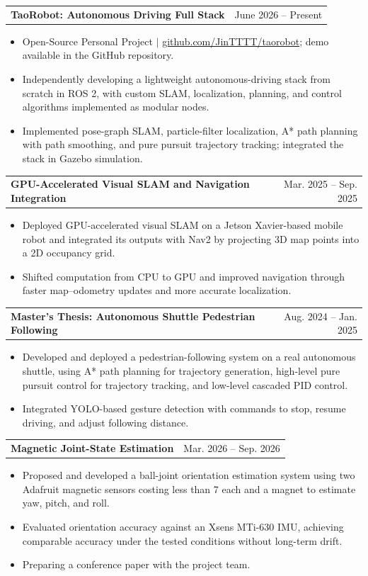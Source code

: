 \documentclass[letterpaper,11pt]{article}
\makeatletter
\newcommand{\resumeItem}[1]{
  \item\small{
    {#1 \vspace{-2pt}}
  }
}
\newcommand{\resumeProjectHeading}[2]{
    \item
    \begin{tabularx}{0.97\textwidth}{@{}>{\raggedright\arraybackslash}X r@{}}
      \small#1 & #2 \\
    \end{tabularx}\vspace{-7pt}
}
\newcommand{\resumeItemListStart}{\begin{itemize}[rightmargin=0.15in]\justifying}
\newcommand{\resumeItemListEnd}{\end{itemize}\vspace{-5pt}}
\makeatother
\begin{document}
      \resumeProjectHeading
          {\textbf{TaoRobot: Autonomous Driving Full Stack}}{June 2026 -- Present}
          \resumeItemListStart
            \resumeItem{Open-Source Personal Project $|$ \href{https://github.com/JinTTTT/taorobot}{github.com/JinTTTT/taorobot}; demo available in the GitHub repository.}
            \resumeItem{Independently developing a lightweight autonomous-driving stack from scratch in ROS 2, with custom SLAM, localization, planning, and control algorithms implemented as modular nodes.}
            \resumeItem{Implemented pose-graph SLAM, particle-filter localization, A* path planning with path smoothing, and pure pursuit trajectory tracking; integrated the stack in Gazebo simulation.}
          \resumeItemListEnd

      \resumeProjectHeading
          {\textbf{GPU-Accelerated Visual SLAM and Navigation Integration}}{Mar. 2025 -- Sep. 2025}
          \resumeItemListStart
            \resumeItem{Deployed GPU-accelerated visual SLAM on a Jetson Xavier-based mobile robot and integrated its outputs with Nav2 by projecting 3D map points into a 2D occupancy grid.}
            \resumeItem{Shifted computation from CPU to GPU and improved navigation through faster map--odometry updates and more accurate localization.}
          \resumeItemListEnd
      \resumeProjectHeading
          {\textbf{Master's Thesis: Autonomous Shuttle Pedestrian Following}}{Aug. 2024 -- Jan. 2025}
          \resumeItemListStart
            \resumeItem{Developed and deployed a pedestrian-following system on a real autonomous shuttle, using A* path planning for trajectory generation, high-level pure pursuit control for trajectory tracking, and low-level cascaded PID control.}
            \resumeItem{Integrated YOLO-based gesture detection with commands to stop, resume driving, and adjust following distance.}
          \resumeItemListEnd

      \resumeProjectHeading
          {\textbf{Magnetic Joint-State Estimation}}{Mar. 2026 -- Sep. 2026}
          \resumeItemListStart
            \resumeItem{Proposed and developed a ball-joint orientation estimation system using two Adafruit magnetic sensors costing less than \texteuro{}7 each and a magnet to estimate yaw, pitch, and roll.}
            \resumeItem{Evaluated orientation accuracy against an Xsens MTi-630 IMU, achieving comparable accuracy under the tested conditions without long-term drift.}
            \resumeItem{Preparing a conference paper with the project team.}
          \resumeItemListEnd
\end{document}

